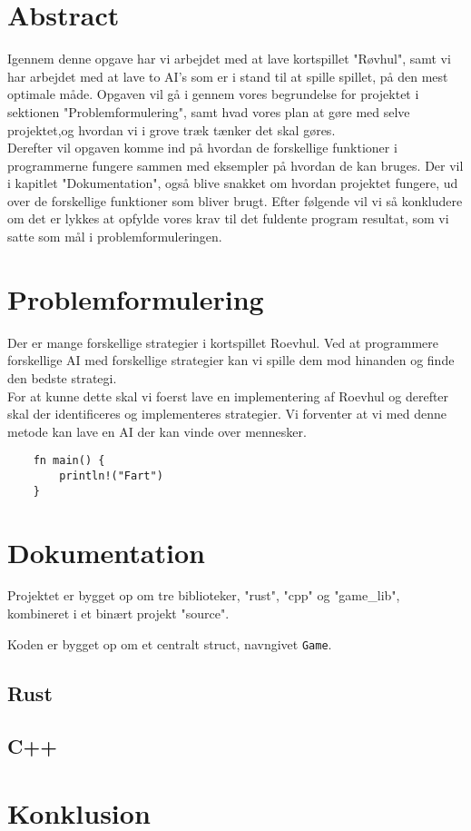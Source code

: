 \documentclass[12pt]{article}
\begin{document}
\section{Abstract}

Igennem denne opgave har vi arbejdet med at lave kortspillet "Røvhul", samt vi har arbejdet med at lave to AI's som er i stand til at spille spillet, på den mest optimale måde. Opgaven vil gå i gennem vores begrundelse for projektet i sektionen "Problemformulering", samt hvad vores plan at gøre med selve projektet,og hvordan vi i grove træk tænker det skal gøres.
\\
Derefter vil opgaven komme ind på hvordan de forskellige funktioner i programmerne fungere sammen med eksempler på hvordan de kan bruges. Der vil i kapitlet "Dokumentation", også blive snakket om hvordan projektet fungere, ud over de forskellige funktioner som bliver brugt. Efter følgende vil vi så konkludere om det er lykkes at opfylde vores krav til det fuldente program resultat, som vi satte som mål i problemformuleringen.

\section{Problemformulering} \label{sec:Problemformulering}

Der er mange forskellige strategier i kortspillet Roevhul. Ved at programmere forskellige AI med forskellige strategier kan vi spille dem mod hinanden og finde den bedste strategi.
\\
For at kunne dette skal vi foerst lave en implementering af Roevhul og derefter skal der identificeres og implementeres strategier. Vi forventer at vi med denne metode kan lave en AI der kan vinde over mennesker.

\begin{verbatim}
	fn main() {
		println!("Fart")
	}
\end{verbatim}

\vfill
\pagebreak

\section{Dokumentation}

Projektet er bygget op om tre biblioteker, "rust", "cpp" og "game\_lib", kombineret i et bin\ae rt projekt "source".

Koden er bygget op om et centralt struct, navngivet \texttt{Game}.

\subsection{Rust}



\subsection{C++}



\vfill
\pagebreak

\section{Konklusion}

\vfill
\pagebreak
\end{document}
